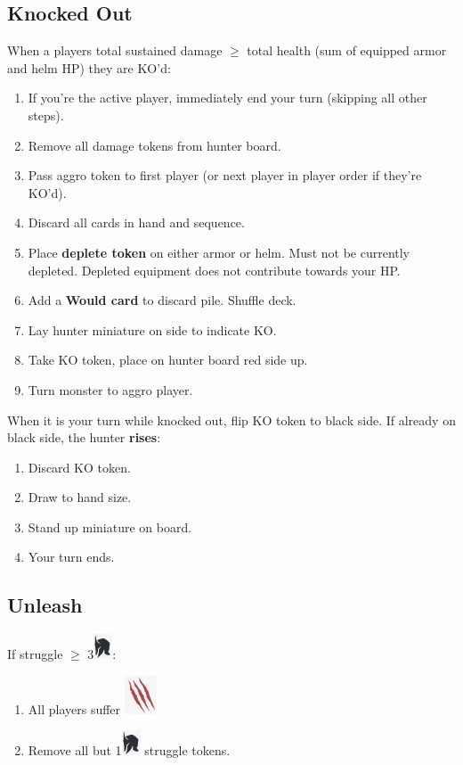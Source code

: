 \documentclass[12pt]{article}
\newenvironment{enumerateCustom}
{\begin{enumerate}
  \setlength{\itemsep}{1pt}
  \setlength{\parskip}{0pt}
  \setlength{\parsep}{0pt}}
{\end{enumerate}}
\begin{document}
\begin{multicols*}{2}
\subsection*{Knocked Out}
When a players total sustained damage $\ge$ total health (sum of equipped armor and helm HP) they are KO'd:
    \begin{enumerateCustom}
        \item If you're the active player, immediately end your turn (skipping all other steps).
        \item Remove all damage tokens from hunter board.
        \item Pass aggro token to first player (or next player in player order if they're KO'd).
        \item Discard all cards in hand and sequence.
        \item Place \textbf{deplete token} on either armor or helm. Must not be currently depleted. Depleted equipment does not contribute towards your HP.
        \item Add a \textbf{Would card} to discard pile. Shuffle deck.
        \item Lay hunter miniature on side to indicate KO.
        \item Take KO token, place on hunter board red side up.
        \item Turn monster to aggro player.
    \end{enumerateCustom}

    When it is your turn while knocked out, flip KO token to black side. If already on black side, the hunter \textbf{rises}:
    \begin{enumerateCustom}
        \item Discard KO token.
        \item Draw to hand size.
        \item Stand up miniature on board.
        \item Your turn ends.
    \end{enumerateCustom}

\subsection*{Unleash}
If struggle $\ge$ 3\includegraphics[scale=0.40]{images/per_player.png}:
    \begin{enumerateCustom}
        \item All players suffer \includegraphics[scale=0.30]{images/monster_damage.png}
        \item Remove all but 1\includegraphics[scale=0.40]{images/per_player.png} struggle tokens.
    \end{enumerateCustom}


\end{multicols*}
\end{document}
